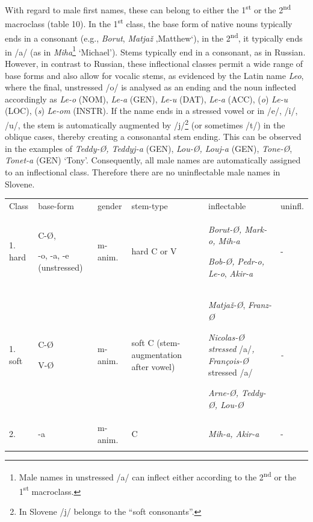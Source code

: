 \documentclass[output=paper]{langscibook}
\begin{document}
With regard to male first names, these can belong to either the 1\textsuperscript{st} or the 2\textsuperscript{nd} macroclass (table 10). In the 1\textsuperscript{st} class, the base form of native nouns typically ends in a consonant (e.g., \textit{Borut}, \textit{Matjaž} ‚Matthew‘), in the 2\textsuperscript{nd}, it typically ends in /a/ (as in \textit{Miha}\footnote{ \textrm{Male names in unstressed /a/ can inflect either according to the 2}\textrm{\textsuperscript{nd}} \textrm{or the 1}\textrm{\textsuperscript{st}} \textrm{macroclass.}} ‘Michael’). Stems typically end in a consonant, as in Russian. However, in contrast to Russian, these inflectional classes permit a wide range of base forms and also allow for vocalic stems, as evidenced by the Latin name \textit{Leo}, where the final, unstressed /o/ is analysed as an ending and the noun inflected accordingly as \textit{Le-o} (NOM), \textit{Le-a} (GEN), \textit{Le-u} (DAT), \textit{Le-a} (ACC), (\textit{o}) \textit{Le-u} (LOC), (\textit{s}) \textit{Le-om} (INSTR). If the name ends in a stressed vowel or in /e/, /i/, /u/, the stem is automatically augmented by /j/\footnote{ \textrm{In Slovene /j/ belongs to the “soft consonants”.}} (or sometimes /t/) in the oblique cases, thereby creating a consonantal stem ending. This can be observed in the examples of \textit{Teddy-Ø, Teddyj-a} (GEN), \textit{Lou-Ø, Louj-a} (GEN), \textit{Tone-Ø}, \textit{Tonet-a} (GEN) ‘Tony’. Consequently, all male names are automatically assigned to an inflectional class. Therefore there are no uninflectable male names in Slovene.


\begin{tabularx}{\textwidth}{XXXXXX}

\lsptoprule

Class & base-form & gender & stem-type & inflectable & uninfl.\\
1. hard & C-Ø, 

{}-o, -a, -e (unstressed) & m-anim. & hard C or V & \textit{Borut-Ø, Mark-o, Mih-a}

\textit{Bob-Ø,} \textit{Pedr-o, Le-o}, \textit{Akir-a} & {}-\\
1. soft & C-Ø

V-Ø & m-anim. & soft C (stem-augmentation after vowel) & \textit{Matjaž-Ø}, \textit{Franz-Ø}

\textit{Nicolas-Ø stressed} /a/\textit{, François-Ø} stressed /a/ 

\textit{Arne-Ø, Teddy-Ø, Lou-Ø} & \textit{{}-}\\
2. & {}-a & m-anim. & C & \textit{Mih-a, Akir-a} & {}-\\
\lspbottomrule
\end{tabularx}
\begin{table}
\caption{Constitutive features of Slovene masculine inflectional classes}
\label{tab:key:10}
\end{table}
\end{document}
